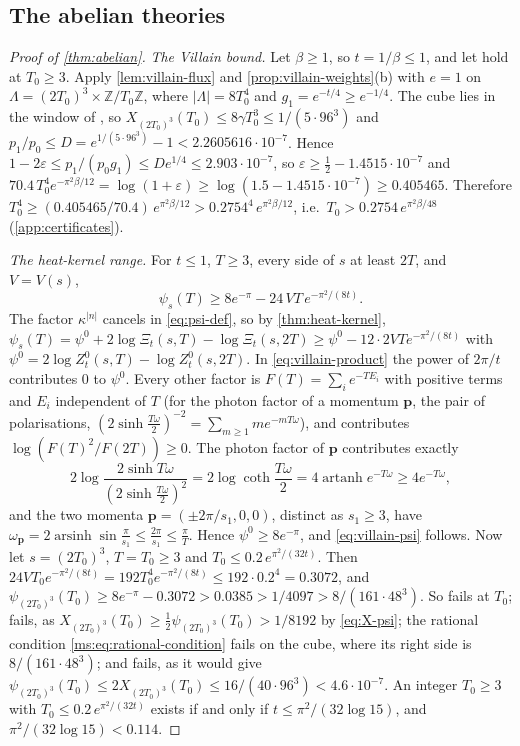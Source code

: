 \documentclass[11pt,a4paper]{amsart}
\theoremstyle{definition}
\theoremstyle{remark}
\numberwithin{equation}{section}
\newcommand{\Z}{\mathbb{Z}}          %
\newcommand{\TT}{\mathbb{T}}               %
\newcommand{\Zc}{\mathcal{Z}}              %
\newcommand{\XT}[2]{X_{#1}(#2)}            %
\newcommand{\psiT}[2]{\psi_{#1}(#2)}       %
\newcommand{\Vol}[1]{V(#1)}                %
\newcommand{\cube}[1]{(2#1)^3}             %
\newcommand{\dconst}{\frac{1}{4097}}       %
\newcommand{\xconst}{\frac{1}{8192}}       %
\newcommand{\dconstinl}{1/4097}            %
\newcommand{\xconstinl}{1/8192}            %
\newcommand{\Mcirc}{\text{\upshape(M$^{\circ}$)}}   %
\newcommand{\Bcirc}{\text{\upshape(B$^{\circ}$)}}   %
\newcommand{\Bstar}{\text{\upshape(B$^{*}$)}}       %
\begin{document}
\subsection{The abelian theories}

\begin{proof}[Proof of \cref{thm:abelian}]
\emph{The Villain bound.} Let $\beta\ge1$, so $t=1/\beta\le1$, and let \Bstar{} hold at $T_0\ge3$. Apply \cref{lem:villain-flux} and \cref{prop:villain-weights}(b) with $e=1$ on $\Lambda=\cube{T_0}\times\Z/T_0\Z$, where $|\Lambda|=8T_0^4$ and $g_1=e^{-t/4}\ge e^{-1/4}$. The cube lies in the window of \Bstar{}, so $\XT{\cube{T_0}}{T_0}\le8\gamma T_0^3\le1/(5\cdot96^3)$ and $p_1/p_0\le D=e^{1/(5\cdot96^3)}-1<2.2605616\cdot10^{-7}$. Hence $1-2\varepsilon\le p_1/(p_0g_1)\le De^{1/4}\le2.903\cdot10^{-7}$, so $\varepsilon\ge\frac12-1.4515\cdot10^{-7}$ and $70.4\,T_0^4e^{-\pi^2\beta/12}=\log(1+\varepsilon)\ge\log(1.5-1.4515\cdot10^{-7})\ge0.405465$. Therefore $T_0^4\ge(0.405465/70.4)\,e^{\pi^2\beta/12}>0.2754^4\,e^{\pi^2\beta/12}$, i.e.\ $T_0>0.2754\,e^{\pi^2\beta/48}$ (\cref{app:certificates}).

\emph{The heat-kernel range.} For $t\le1$, $T\ge3$, every side of $s$ at least $2T$, and $V=\Vol s$,
\begin{equation}\label{eq:villain-psi}
\psiT sT\ge8e^{-\pi}-24\,VT\,e^{-\pi^2/(8t)} .
\end{equation}
The factor $\kappa^{|n|}$ cancels in \eqref{eq:psi-def}, so by \cref{thm:heat-kernel}, $\psiT sT=\psi^0+2\log\Xi_t(s,T)-\log\Xi_t(s,2T)\ge\psi^0-12\cdot2VTe^{-\pi^2/(8t)}$ with $\psi^0=2\log Z^0_t(s,T)-\log Z^0_t(s,2T)$. In \eqref{eq:villain-product} the power of $2\pi/t$ contributes $0$ to $\psi^0$. Every other factor is $F(T)=\sum_ie^{-TE_i}$ with positive terms and $E_i$ independent of $T$ (for the photon factor of a momentum $\mathbf p$, the pair of polarisations, $(2\sinh\frac{T\omega}2)^{-2}=\sum_{m\ge1}me^{-mT\omega}$), and contributes $\log(F(T)^2/F(2T))\ge0$. The photon factor of $\mathbf p$ contributes exactly
\[
2\log\frac{2\sinh T\omega}{(2\sinh\frac{T\omega}2)^2}=2\log\coth\frac{T\omega}2=4\operatorname{artanh}e^{-T\omega}\ge4e^{-T\omega},
\] and the two momenta $\mathbf p=(\pm2\pi/s_1,0,0)$, distinct as $s_1\ge3$, have $\omega_{\mathbf p}=2\operatorname{arsinh}\sin\frac\pi{s_1}\le\frac{2\pi}{s_1}\le\frac\pi T$. Hence $\psi^0\ge8e^{-\pi}$, and \eqref{eq:villain-psi} follows. Now let $s=\cube{T_0}$, $T=T_0\ge3$ and $T_0\le0.2\,e^{\pi^2/(32t)}$. Then $24VT_0e^{-\pi^2/(8t)}=192T_0^4e^{-\pi^2/(8t)}\le192\cdot0.2^4=0.3072$, and $\psiT{\cube{T_0}}{T_0}\ge8e^{-\pi}-0.3072>0.0385>\dconstinl>8/(161\cdot48^3)$. So \Mcirc{} fails at $T_0$; \Bcirc{} fails, as $\XT{\cube{T_0}}{T_0}\ge\frac12\psiT{\cube{T_0}}{T_0}>\xconstinl$ by \eqref{eq:X-psi}; the rational condition \eqref{ms:eq:rational-condition} fails on the cube, where its right side is $8/(161\cdot48^3)$; and \Bstar{} fails, as it would give $\psiT{\cube{T_0}}{T_0}\le2\XT{\cube{T_0}}{T_0}\le16/(40\cdot96^3)<4.6\cdot10^{-7}$. An integer $T_0\ge3$ with $T_0\le0.2\,e^{\pi^2/(32t)}$ exists if and only if $t\le\pi^2/(32\log15)$, and $\pi^2/(32\log15)<0.114$.


\end{proof}
\end{document}

